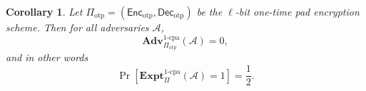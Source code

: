\documentclass[11pt]{article}
\newtheorem{corollary}{Corollary}
\newtheorem{theorem}{Theorem}
\newcommand{\getsr}
  {{\:\stackrel{\raisebox{-2pt}{${\scriptscriptstyle \hspace{0.2em}\$}$}}
   {\leftarrow}\:}}
\newcommand{\msgs}{\mathcal{M}}
\newcommand{\ctxts}{\mathcal{C}}
\newcommand{\keys}{\mathcal{K}}
\newcommand{\Enc}{\mathsf{Enc}}
\newcommand{\Dec}{\mathsf{Dec}}
\newcommand{\calD}{\mathcal{D}}
\newcommand{\calA}{\mathcal{A}}
\newcommand{\Adv}{\mathbf{Adv}}
\newcommand{\AdvPRG}[2]{\Adv^{\mathrm{prg}}_{#1}({#2})}
\newcommand{\bits}{\{0,1\}}
\newcommand{\bK}{\mathbf{K}}
\newcommand{\bU}{\mathbf{U}}
\newcommand{\hatb}{\hat{b}}
\newcommand{\ExptOTCPA}{\mathbf{Expt}^{\mathrm{1\mbox{-}cpa}}}
\newcommand{\AdvOTCPA}[2]{\Adv^{\mathrm{1\mbox{-}cpa}}_{#1}({#2})}
\newcommand{\Piotp}{\Pi_\mathrm{otp}}
\newcommand{\Encotp}{\Enc_\mathrm{otp}}
\newcommand{\Decotp}{\Dec_\mathrm{otp}}
\begin{document}
\begin{corollary}
    Let $\Piotp = (\Encotp, \Decotp)$ be the $\ell$-bit one-time pad encryption
    scheme. Then for all adversaries $\calA$,
    \[
        \AdvOTCPA{\Piotp}{\calA} = 0,
    \]
    and in other words
    \[
        \Pr[\ExptOTCPA_\Pi(\calA) = 1] = \frac{1}{2}.
    \]
\end{corollary}

\end{document}
